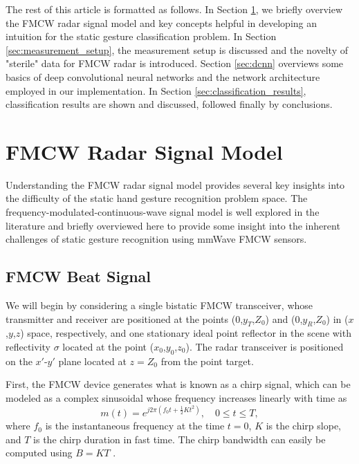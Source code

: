 \documentclass{ieeeaccess}
\begin{document}
The rest of this article is formatted as follows. In Section \ref{sec:fmcw_radar}, we briefly overview the FMCW radar signal model and key concepts helpful in developing an intuition for the static gesture classification problem. In Section \ref{sec:measurement_setup}, the measurement setup is discussed and the novelty of "sterile" data for FMCW radar is introduced. Section \ref{sec:dcnn} overviews some basics of deep convolutional neural networks and the network architecture employed in our implementation. In Section \ref{sec:classification_results}, classification results are shown and discussed, followed finally by conclusions.

\section{FMCW Radar Signal Model}
\label{sec:fmcw_radar}
Understanding the FMCW radar signal model provides several key insights into the difficulty of the static hand gesture recognition problem space. The frequency-modulated-continuous-wave signal model is well explored in the literature \cite{josiah:isar} and briefly overviewed here to provide some insight into the inherent challenges of static gesture recognition using mmWave FMCW sensors.

\subsection{FMCW Beat Signal}
\label{subsec:fmcw_beat_signal}
We will begin by considering a single bistatic FMCW transceiver, whose transmitter and receiver are positioned at the points ($0$,$y_T$,$Z_0$) and ($0$,$y_R$,$Z_0$) in ($x$,$y$,$z$) space, respectively, and one stationary ideal point reflector in the scene with reflectivity $\sigma$ located at the point ($x_0$,$y_0$,$z_0$). The radar transceiver is positioned on the $x'$-$y'$ plane located at $z = Z_0$ from the point target.

First, the FMCW device generates what is known as a chirp signal, which can be modeled as a complex sinusoidal whose frequency increases linearly with time as
\begin{equation}
    m(t) = e^{j2\pi(f_0t + \frac{1}{2}Kt^2)}, \quad 0 \leq t \leq T,
\end{equation}
where $f_0$ is the instantaneous frequency at the time $t=0$, $K$ is the chirp slope, and $T$ is the chirp duration in fast time. The chirp bandwidth can easily be computed using $B = KT$ \cite{Yanik:ConcealedItemImaging}.
\end{document}
